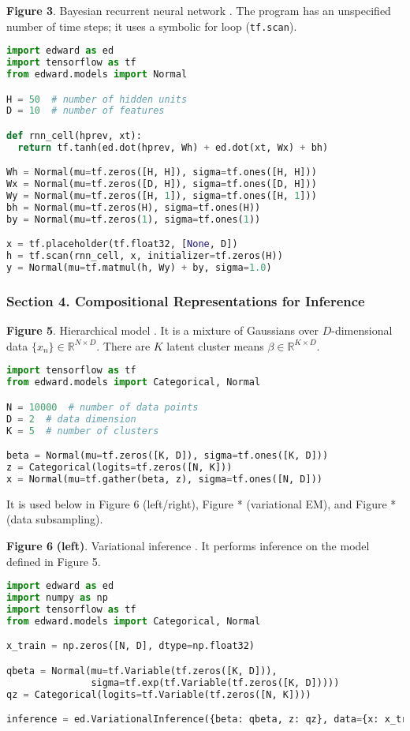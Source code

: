 \textbf{Figure 3}. Bayesian recurrent neural network \citep{neal2012bayesian}.
The program has an unspecified number of time steps; it uses a
symbolic for loop (\texttt{tf.scan}).
\begin{lstlisting}[language=python]
import edward as ed
import tensorflow as tf
from edward.models import Normal

H = 50  # number of hidden units
D = 10  # number of features

def rnn_cell(hprev, xt):
  return tf.tanh(ed.dot(hprev, Wh) + ed.dot(xt, Wx) + bh)

Wh = Normal(mu=tf.zeros([H, H]), sigma=tf.ones([H, H]))
Wx = Normal(mu=tf.zeros([D, H]), sigma=tf.ones([D, H]))
Wy = Normal(mu=tf.zeros([H, 1]), sigma=tf.ones([H, 1]))
bh = Normal(mu=tf.zeros(H), sigma=tf.ones(H))
by = Normal(mu=tf.zeros(1), sigma=tf.ones(1))

x = tf.placeholder(tf.float32, [None, D])
h = tf.scan(rnn_cell, x, initializer=tf.zeros(H))
y = Normal(mu=tf.matmul(h, Wy) + by, sigma=1.0)
\end{lstlisting}

\subsubsection{Section 4. Compositional Representations for Inference}

\textbf{Figure 5}. Hierarchical model \citep{gelman2006data}.
  It is a mixture of Gaussians over
  $D$-dimensional data $\{x_n\}\in\mathbb{R}^{N\times D}$. There are
  $K$ latent cluster means $\beta\in\mathbb{R}^{K\times D}$.
\begin{lstlisting}[language=python]
import tensorflow as tf
from edward.models import Categorical, Normal

N = 10000  # number of data points
D = 2  # data dimension
K = 5  # number of clusters

beta = Normal(mu=tf.zeros([K, D]), sigma=tf.ones([K, D]))
z = Categorical(logits=tf.zeros([N, K]))
x = Normal(mu=tf.gather(beta, z), sigma=tf.ones([N, D]))
\end{lstlisting}
It is used below in Figure 6 (left/right), Figure * (variational EM),
and Figure * (data subsampling).

\textbf{Figure 6} \textbf{(left)}. Variational inference
\citep{jordan1999introduction}.
It performs inference on the model defined in Figure 5.
\begin{lstlisting}[language=python]
import edward as ed
import numpy as np
import tensorflow as tf
from edward.models import Categorical, Normal

x_train = np.zeros([N, D], dtype=np.float32)

qbeta = Normal(mu=tf.Variable(tf.zeros([K, D])),
               sigma=tf.exp(tf.Variable(tf.zeros([K, D]))))
qz = Categorical(logits=tf.Variable(tf.zeros([N, K])))

inference = ed.VariationalInference({beta: qbeta, z: qz}, data={x: x_train})
\end{lstlisting}

